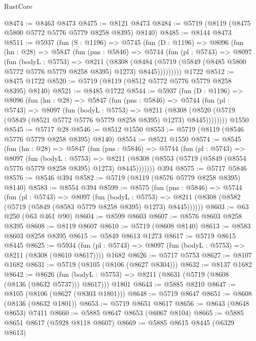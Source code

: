 \begin{lexlean}{RustCore}
\begin{coremodule}
{\begin{coremodule}
{{{{{{{{{{{{{{{{{{{{{{{{{{{{{{{{{{{{{{{{{{{{@8474 := @8463 @8473
@8475 := @8121 @8473
@8484 := @5719 (@8119 (@8475 @5800 @5772 @5776 @5779 @8258 @8395) @8140)
@8485 := @8144 @8473
@8511 := @5937
    (fun (S : @1196) =>
    @5745
      (fun (D : @1196) =>
      @8096
        (fun (hn : @28) =>
        @5847
          (fun (pns : @5846) =>
          @5744
            (fun (pl : @5743) =>
            @8097
              (fun (bodyL : @5753) =>
              @8211
                (@8308
                  (@8484
                    (@5719 (@5849 (@8485 @5800 @5772 @5776 @5779 @8258 @8395) @1273) @8445)))))))))
    @1722
@8512 := @8475 @1722
@8520 := @5719 (@8119 (@8512 @5772 @5776 @5779 @8258 @8395) @8140)
@8521 := @8485 @1722
@8544 := @5937
    (fun (D : @1196) =>
    @8096
      (fun (hn : @28) =>
      @5847
        (fun (pns : @5846) =>
        @5744
          (fun (pl : @5743) =>
          @8097
            (fun (bodyL : @5753) =>
            @8211
              (@8308 (@8520 (@5719 (@5849 (@8521 @5772 @5776 @5779 @8258 @8395) @1273) @8445))))))))
    @1550
@8545 := @5717 @28
@8546 := @8512 @1550
@8553 := @5719 (@8119 (@8546 @5776 @5779 @8258 @8395) @8140)
@8554 := @8521 @1550
@8574 := @8545
    (fun (hn : @28) =>
    @5847
      (fun (pns : @5846) =>
      @5744
        (fun (pl : @5743) =>
        @8097
          (fun (bodyL : @5753) =>
          @8211 (@8308 (@8553 (@5719 (@5849 (@8554 @5776 @5779 @8258 @8395) @1273) @8445)))))))
    @394
@8575 := @5717 @5846
@8576 := @8546 @394
@8582 := @5719 (@8119 (@8576 @5779 @8258 @8395) @8140)
@8583 := @8554 @394
@8599 := @8575
    (fun (pns : @5846) =>
    @5744
      (fun (pl : @5743) =>
      @8097
        (fun (bodyL : @5753) =>
        @8211 (@8308 (@8582 (@5719 (@5849 (@8583 @5779 @8258 @8395) @1273) @8445))))))
@8603 := @63 @250 (@63 @461 @90)
@8604 := @8599 @8603
@8607 := @8576 @8603 @8258 @8395
@8608 := @8119 @8607
@8610 := @5719 (@8608 @8140)
@8613 := @8583 @8603 @8258 @8395
@8615 := @5849 @8613 @1273
@8617 := @5719 @8615 @8445
@8625 := @5934
    (fun (pl : @5743) => @8097 (fun (bodyL : @5753) => @8211 (@8308 (@8610 @8617))))
    @1682
@8626 := @5717 @5753
@8627 := @8107 @1682
@8631 := @5719 (@8105 (@8106 (@8627 @8304)))
@8632 := @8137 @1682
@8642 := @8626
    (fun (bodyL : @5753) => @8211 (@8631 (@5719 (@8608 (@8136 (@8632 @5737))) @8617)))
    @1801
@8643 := @5885 @8210
@8647 := @8105 (@8106 (@8627 (@8303 @1801)))
@8648 := @5719 @8647
@8651 := @8608 (@8136 (@8632 @1801))
@8653 := @5719 @8651 @8617
@8656 := @8643 (@8648 @8653) @7411
@8660 := @5885 @8647 @8653 (@6067 @8104)
@8665 := @5885 @8651 @8617 (@5928 @8118 @8607)
@8669 := @5885 @8615 @8445 (@6329 @8613)
}}}}}}}}}}}}}}}}}}}}}}}}}}}}}}}}}}}}}}}}}}}}
\end{coremodule}}
\end{coremodule}
\end{lexlean}
